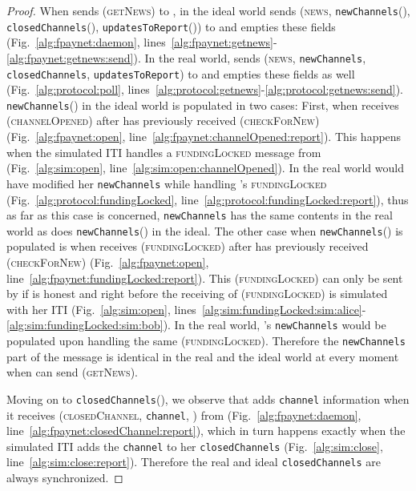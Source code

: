 \begin{proof}
  When \environment{} sends (\textsc{getNews}) to \alice, in the ideal world
  \fpaynet{} sends (\textsc{news}, \texttt{newChannels}(\alice),
  \texttt{closedChannels}(\alice), \texttt{updatesToReport}(\alice)) to
  \environment{} and empties these fields (Fig.~\ref{alg:fpaynet:daemon},
  lines~\ref{alg:fpaynet:getnews}-\ref{alg:fpaynet:getnews:send}). In the real
  world, \alice{} sends (\textsc{news}, \texttt{newChannels},
  \texttt{closedChannels}, \texttt{updatesToReport}) to \environment{} and
  empties these fields as well (Fig.~\ref{alg:protocol:poll},
  lines~\ref{alg:protocol:getnews}-\ref{alg:protocol:getnews:send}).
  \texttt{newChannels}(\alice) in the ideal world is populated in two cases:
  First, when \fpaynet{} receives (\textsc{channelOpened}) after \alice{} has
  previously received (\textsc{checkForNew}) (Fig.~\ref{alg:fpaynet:open},
  line~\ref{alg:fpaynet:channelOpened:report}). This happens when the simulated
  \alice{} ITI handles a \textsc{fundingLocked} message from \bob{}
  (Fig.~\ref{alg:sim:open}, line~\ref{alg:sim:open:channelOpened}). In the real
  world \alice{} would have modified her \texttt{newChannels} while handling
  \bob's \textsc{fundingLocked} (Fig.~\ref{alg:protocol:fundingLocked},
  line~\ref{alg:protocol:fundingLocked:report}), thus as far as this case is
  concerned, \texttt{newChannels} has the same contents in the real world as
  does \texttt{newChannels}(\alice) in the ideal. The other case when
  \texttt{newChannels}(\alice) is populated is when \fpaynet{} receives
  (\textsc{fundingLocked}) after \bob{} has previously received
  (\textsc{checkForNew}) (Fig.~\ref{alg:fpaynet:open},
  line~\ref{alg:fpaynet:fundingLocked:report}). This (\textsc{fundingLocked})
  can only be sent by \simulator{} if \alice{} is honest and right before the
  receiving of (\textsc{fundingLocked}) is simulated with her ITI
  (Fig.~\ref{alg:sim:open},
  lines~\ref{alg:sim:fundingLocked:sim:alice}-\ref{alg:sim:fundingLocked:sim:bob}).
  In the real world, \alice's \texttt{newChannels} would be populated upon
  handling the same (\textsc{fundingLocked}). Therefore the \texttt{newChannels}
  part of the message is identical in the real and the ideal world at every
  moment when \environment{} can send (\textsc{getNews}).

  Moving on to \texttt{closedChannels}(\alice), we observe that \fpaynet{} adds
  \texttt{channel} information when it receives (\textsc{closedChannel},
  \texttt{channel}, \alice) from \simulator{} (Fig.~\ref{alg:fpaynet:daemon},
  line~\ref{alg:fpaynet:closedChannel:report}), which in turn happens exactly
  when the simulated \alice{} ITI adds the \texttt{channel} to her
  \texttt{closedChannels} (Fig.~\ref{alg:sim:close},
  line~\ref{alg:sim:close:report}). Therefore the real and ideal
  \texttt{closedChannels} are always synchronized.


\end{proof}
